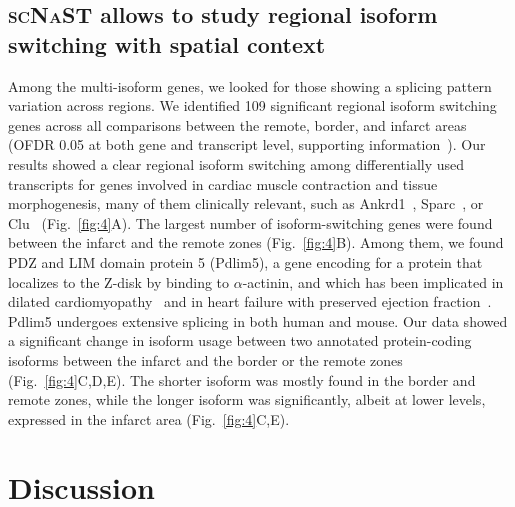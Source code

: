 \documentclass[utf8]{FrontiersinHarvard} %
\newcommand{\scnast}{\textsc{scNaST}\xspace}
\begin{document}
\subsection*{\scnast allows to study regional isoform switching with spatial context}
Among the multi-isoform genes, we looked for those showing a splicing pattern variation across regions.
We identified 109 significant regional isoform switching genes across all comparisons between the remote, border, and infarct areas (OFDR 0.05 at both gene and transcript level, supporting information~).
Our results showed a clear regional isoform switching among differentially used transcripts for genes involved in cardiac muscle contraction and tissue morphogenesis, many of them clinically relevant, such as Ankrd1~\citep{Mikhailov2008:Ankrd1}, Sparc~\citep{McCurdy2011:Sparc}, or Clu~\citep{Turkieh2019:Clu} (Fig.~\ref{fig:4}A).
The largest number of isoform-switching genes were found between the infarct and the remote zones (Fig.~\ref{fig:4}B).
Among them, we found PDZ and LIM domain protein 5 (Pdlim5), a gene encoding for a protein that localizes to the Z-disk by binding to $\alpha$-actinin, and which has been implicated in dilated cardiomyopathy~\citep{Verdonschot2020:Pdlim5} and in heart failure with preserved ejection fraction~\citep{Soetkamp2021:PKC_HFpEF}.
Pdlim5 undergoes extensive splicing in both human and mouse.
Our data showed a significant change in isoform usage between two annotated protein-coding isoforms between the infarct and the border or the remote zones (Fig.~\ref{fig:4}C,D,E).
The shorter isoform was mostly found in the border and remote zones, while the longer isoform was significantly, albeit at lower levels, expressed in the infarct area (Fig.~\ref{fig:4}C,E).


\section*{Discussion}
\end{document}
